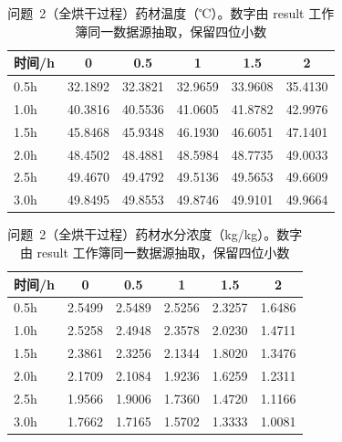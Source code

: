 \begin{table}[htbp]
\centering
\caption{问题~2（全烘干过程）药材温度（℃）。数字由 result 工作簿同一数据源抽取，保留四位小数}
\label{tab:表3}
\small
\begin{tabular}{lccccc}
\toprule
时间/h & 0 & 0.5 & 1 & 1.5 & 2 \\
\midrule
0.5h & 32.1892 & 32.3821 & 32.9659 & 33.9608 & 35.4130 \\
1.0h & 40.3816 & 40.5536 & 41.0605 & 41.8782 & 42.9976 \\
1.5h & 45.8468 & 45.9348 & 46.1930 & 46.6051 & 47.1401 \\
2.0h & 48.4502 & 48.4881 & 48.5984 & 48.7735 & 49.0033 \\
2.5h & 49.4670 & 49.4792 & 49.5136 & 49.5653 & 49.6609 \\
3.0h & 49.8495 & 49.8553 & 49.8746 & 49.9101 & 49.9664 \\
\bottomrule
\end{tabular}
\end{table}

\begin{table}[htbp]
\centering
\caption{问题~2（全烘干过程）药材水分浓度（kg/kg）。数字由 result 工作簿同一数据源抽取，保留四位小数}
\label{tab:表4}
\small
\begin{tabular}{lccccc}
\toprule
时间/h & 0 & 0.5 & 1 & 1.5 & 2 \\
\midrule
0.5h & 2.5499 & 2.5489 & 2.5256 & 2.3257 & 1.6486 \\
1.0h & 2.5258 & 2.4948 & 2.3578 & 2.0230 & 1.4711 \\
1.5h & 2.3861 & 2.3256 & 2.1344 & 1.8020 & 1.3476 \\
2.0h & 2.1709 & 2.1084 & 1.9236 & 1.6259 & 1.2311 \\
2.5h & 1.9566 & 1.9006 & 1.7360 & 1.4720 & 1.1166 \\
3.0h & 1.7662 & 1.7165 & 1.5702 & 1.3333 & 1.0081 \\
\bottomrule
\end{tabular}
\end{table}

